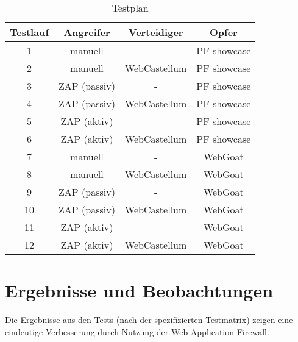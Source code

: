 \begin{table}[h]
    \centering
    \begin{tabular}{cccc} 
      \toprule
    \textbf{Testlauf} & \textbf{Angreifer} & \textbf{Verteidiger} & \textbf{Opfer} \\ 
     \midrule
     1 & manuell & - & PF showcase\\
     2 & manuell & WebCastellum & PF showcase \\
     3 & ZAP (passiv) & - & PF showcase\\
     4 & ZAP (passiv) & WebCastellum & PF showcase \\
     5 & ZAP (aktiv) & - & PF showcase\\
     6 & ZAP (aktiv) & WebCastellum & PF showcase \\
     7 & manuell & - & WebGoat \\ 
    8 & manuell & WebCastellum & WebGoat \\
    9 & ZAP (passiv) & - & WebGoat \\ 
    10 & ZAP (passiv) & WebCastellum & WebGoat \\
    11 & ZAP (aktiv) & - & WebGoat \\ 
    12 & ZAP (aktiv) & WebCastellum & WebGoat \\
   \bottomrule
    \end{tabular}
    \caption{Testplan}
    \label{tab:testplan}
\end{table}

\section{Ergebnisse und Beobachtungen}




Die Ergebnisse aus den Tests (nach der spezifizierten Testmatrix) zeigen eine eindeutige Verbesserung durch Nutzung der Web Application Firewall. 

